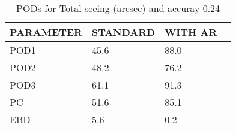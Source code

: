 \begin{table}[]
\begin{center}
\begin{tabular}{|l|l|l|l|}
\hline
\multicolumn{1}{|c|}{\cellcolor[HTML]{C0C0C0}\textbf{PARAMETER}} & \multicolumn{1}{c|}{\cellcolor[HTML]{C0C0C0}\textbf{STANDARD}} & \multicolumn{1}{c|}{\cellcolor[HTML]{C0C0C0}\textbf{WITH AR}} \\
\hline
\cellcolor[HTML]{C0C0C0}POD1  & 45.6                                & 88.0         \\
\cellcolor[HTML]{C0C0C0}POD2  & 48.2                                & 76.2         \\
\cellcolor[HTML]{C0C0C0}POD3  & 61.1                                & 91.3         \\
\cellcolor[HTML]{C0C0C0}PC    & 51.6                                  & 85.1           \\
\cellcolor[HTML]{C0C0C0}EBD   & 5.6                                 & 0.2          \\
\hline
\end{tabular}
\caption{PODs for Total seeing (arcsec) and accuray 0.24}
\end{center}
\end{table}
